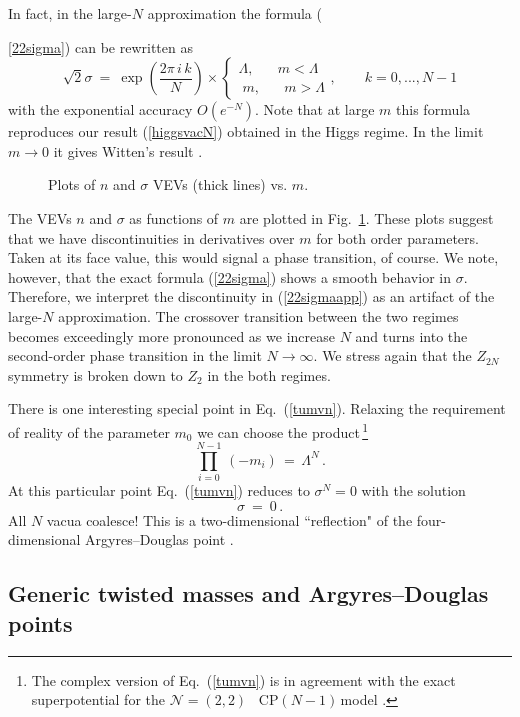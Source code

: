 \documentclass[epsfig,12pt]{article}
\def\beq{\begin{equation}}
\def\eeq{\end{equation}}
\newcommand{\cpn}{CP$(N-1)\,$}
\def\beq{\begin{equation}}
\def\eeq{\end{equation}}
\newcommand{\ntwot}{${\mathcal N}= \left(2,2\right) $ }
\begin{document}
In fact, in the large-$N$ approximation the formula ({\ref{22sigma}) can be rewritten as
\beq
\sqrt{2}\sigma ~=~ \exp\left( \frac{2\pi\,i\, k}{N}
\right)\times \left\{
\begin{array}{cc}
\Lambda,\;\;\;\;\;\;m <\Lambda\\[1mm]
\;m,\;\;\;\;\;\; m > \Lambda
\end{array},
\right.
 \qquad k=0, ..., N-1
\label{22sigmaapp}
\eeq
with the exponential accuracy   $O\left(e^{-N}\right)$. Note that at large $m$ this formula reproduces our
result (\ref{higgsvacN}) obtained in the Higgs regime. In the limit $m\to 0$ it gives Witten's
result  \cite{W79}.

\begin{figure}
\epsfxsize=7cm
\centerline{}
\caption{\small Plots of $n$ and $\sigma$ VEVs (thick lines) vs. $m$. }
\label{fig22nsigma}
\end{figure}

The  VEVs $n$ and $\sigma$ as functions of $m$ are plotted in Fig.~\ref{fig22nsigma}.
These plots suggest that we have  discontinuities in derivatives over $m$ for both order
parameters. Taken at its face value, this would signal a phase transition, of course. We note, however, that 
the exact formula
(\ref{22sigma}) shows a smooth behavior in $\sigma$. Therefore, we interpret the discontinuity in
(\ref{22sigmaapp}) as an artifact of the large-$N$ approximation. The crossover transition between 
the two regimes becomes exceedingly more pronounced as we increase 
$N$ and turns into the second-order phase transition in the
limit $N\to\infty$. We stress again that the $Z_{2N}$ symmetry is broken down to $Z_2$ in 
the both regimes.

There is one interesting special point in Eq.~(\ref{tumvn}).
Relaxing the requirement of reality of the parameter $m_0$ we can choose the 
product\,\footnote{The complex version of Eq.~(\ref{tumvn}) is in agreement
with the exact superpotential for the \mbox{\ntwot} \cpn model
\cite{AdDVecSal,ChVa,W93,HaHo,Dor}.}
\beq
\prod_{i=0}^{N-1}\,(-m_i) \,=\,\Lambda^N\,.
\label{ADpoint}
\eeq
At this particular point 
 Eq.~(\ref{tumvn}) reduces to $\sigma^N =0$ with the solution
\beq
\sigma ~=~ 0\,.
\label{ADsigma}
\eeq
All $N$ vacua coalesce!  
This is a two-dimensional ``reflection" of the four-dimensional
Argyres--Douglas point \cite{AD,APSW}.


\subsection{Generic twisted masses and  Argyres--Douglas points}

}
\end{document}

